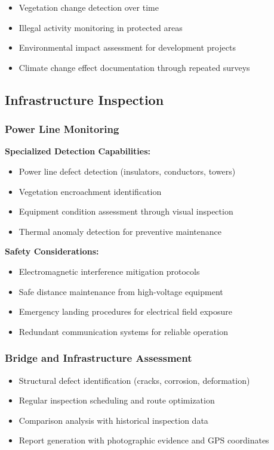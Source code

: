 \documentclass[12pt,a4paper]{article}
\begin{document}
\begin{itemize}
    \item Vegetation change detection over time
    \item Illegal activity monitoring in protected areas
    \item Environmental impact assessment for development projects
    \item Climate change effect documentation through repeated surveys
\end{itemize}

\subsection{Infrastructure Inspection}

\subsubsection{Power Line Monitoring}

\textbf{Specialized Detection Capabilities:}
\begin{itemize}
    \item Power line defect detection (insulators, conductors, towers)
    \item Vegetation encroachment identification
    \item Equipment condition assessment through visual inspection
    \item Thermal anomaly detection for preventive maintenance
\end{itemize}

\textbf{Safety Considerations:}
\begin{itemize}
    \item Electromagnetic interference mitigation protocols
    \item Safe distance maintenance from high-voltage equipment
    \item Emergency landing procedures for electrical field exposure
    \item Redundant communication systems for reliable operation
\end{itemize}

\subsubsection{Bridge and Infrastructure Assessment}

\begin{itemize}
    \item Structural defect identification (cracks, corrosion, deformation)
    \item Regular inspection scheduling and route optimization
    \item Comparison analysis with historical inspection data
    \item Report generation with photographic evidence and GPS coordinates
\end{itemize}
\end{document}
